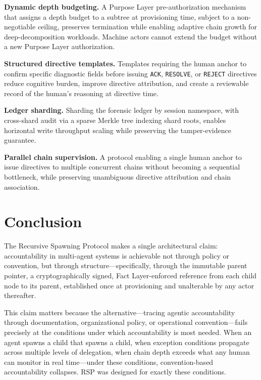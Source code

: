 \noindent\textbf{Dynamic depth budgeting.} A Purpose Layer pre-authorization mechanism that assigns a depth budget to a subtree at provisioning time, subject to a non-negotiable ceiling, preserves termination while enabling adaptive chain growth for deep-decomposition workloads. Machine actors cannot extend the budget without a new Purpose Layer authorization.

\noindent\textbf{Structured directive templates.} Templates requiring the human anchor to confirm specific diagnostic fields before issuing \texttt{ACK}, \texttt{RESOLVE}, or \texttt{REJECT} directives reduce cognitive burden, improve directive attribution, and create a reviewable record of the human's reasoning at directive time.

\noindent\textbf{Ledger sharding.} Sharding the forensic ledger by session namespace, with cross-shard audit via a sparse Merkle tree indexing shard roots, enables horizontal write throughput scaling while preserving the tamper-evidence guarantee.

\noindent\textbf{Parallel chain supervision.} A protocol enabling a single human anchor to issue directives to multiple concurrent chains without becoming a sequential bottleneck, while preserving unambiguous directive attribution and chain association.


\section{Conclusion}
\label{sec:rs-conclusion}

The Recursive Spawning Protocol makes a single architectural claim: accountability in multi-agent systems is achievable not through policy or convention, but through structure---specifically, through the immutable parent pointer, a cryptographically signed, Fact Layer-enforced reference from each child node to its parent, established once at provisioning and unalterable by any actor thereafter.

This claim matters because the alternative---tracing agentic accountability through documentation, organizational policy, or operational convention---fails precisely at the conditions under which accountability is most needed. When an agent spawns a child that spawns a child, when exception conditions propagate across multiple levels of delegation, when chain depth exceeds what any human can monitor in real time---under these conditions, convention-based accountability collapses. RSP was designed for exactly these conditions.

